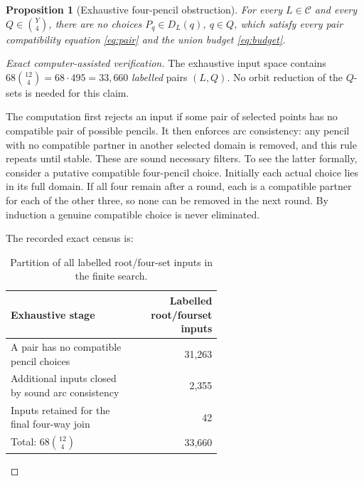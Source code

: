 \documentclass[11pt]{article}
\newcommand{\bin}[2]{\binom{#1}{#2}}
\newcommand{\cat}{\mathcal C}
\newtheorem{proposition}[theorem]{Proposition}
\theoremstyle{definition}
\theoremstyle{remark}
\begin{document}
\begin{proposition}[Exhaustive four-pencil obstruction]
\label{prop:finite}
For every $L\in\cat$ and every $Q\in\bin{Y}{4}$, there are
no choices $P_q\in D_L(q)$, $q\in Q$, which satisfy every pair
compatibility equation \eqref{eq:pair} and the union budget
\eqref{eq:budget}.
\end{proposition}

\begin{proof}[Exact computer-assisted verification]
The exhaustive input space contains
$68\bin{12}{4}=68\cdot495=33{,}660$ \emph{labelled} pairs $(L,Q)$.
No orbit reduction of the $Q$-sets is needed for this claim.

The computation first rejects an input if some pair of selected points
has no compatible pair of possible pencils. It then enforces arc
consistency: any pencil with no compatible partner in another
selected domain is removed, and this rule repeats until stable.
These are sound necessary filters. To see the latter formally,
consider a putative compatible four-pencil choice. Initially each
actual choice lies in its full domain. If all four remain after a
round, each is a compatible partner for each of the other three,
so none can be removed in the next round. By induction a genuine
compatible choice is never eliminated.

The recorded exact census is:
\begin{table}[ht]
\centering\small
\begin{tabular}{@{}p{0.59\linewidth}r@{}}
\toprule
Exhaustive stage & Labelled root/fourset inputs \\
\midrule
A pair has no compatible pencil choices & 31,263\\
Additional inputs closed by sound arc consistency & 2,355\\
Inputs retained for the final four-way join & 42\\
\midrule
Total: $68\bin{12}{4}$ & 33,660\\
\bottomrule
\end{tabular}
\caption{Partition of all labelled root/four-set inputs in the finite search.}\label{tab:filter}
\end{table}


\end{proof}
\end{document}
